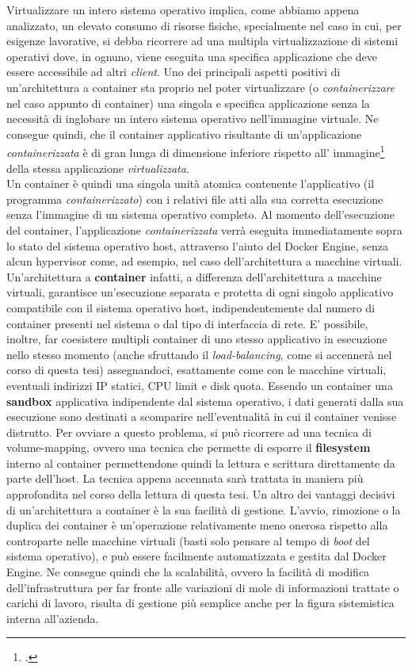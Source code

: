 Virtualizzare un intero sistema operativo implica, come abbiamo appena analizzato, un elevato consumo di risorse fisiche, specialmente nel caso in cui, per esigenze lavorative, si debba ricorrere ad una multipla virtualizzazione di sistemi operativi dove, in ognuno, viene eseguita una specifica applicazione che deve essere accessibile ad altri \textit{client}.
Uno dei principali aspetti positivi di un'architettura a container sta proprio nel poter virtualizzare (o \textit{containerizzare} nel caso appunto di container) una singola e specifica applicazione senza la necessità di inglobare un intero sistema operativo nell'immagine virtuale. Ne consegue quindi, che il container applicativo risultante di un'applicazione \textit{containerizzata} è di gran lunga di dimensione inferiore rispetto all' immagine\footcite{inteso come dimensione in Gb del virtual disk image (*.vdi) dell'immagine virtualizzata} della stessa applicazione \textit{virtualizzata}.\\
Un container è quindi una singola unità atomica contenente l'applicativo (il programma \textit{containerizzato}) con i relativi file atti alla sua corretta esecuzione senza l'immagine di un sistema operativo completo.
Al momento dell'esecuzione del container, l'applicazione \textit{containerizzata} verrà eseguita immediatamente sopra lo stato del sistema operativo host, attraverso l'aiuto del Docker Engine, senza alcun hypervisor come, ad esempio, nel caso dell'architettura a macchine virtuali.
Un'architettura a \textbf{container} infatti, a differenza dell'architettura a macchine virtuali, garantisce un'esecuzione separata e protetta di ogni singolo applicativo compatibile con il sistema operativo host, indipendentemente dal numero di container presenti nel sistema o dal tipo di interfaccia di rete. E' possibile, inoltre, far coesistere multipli container di uno stesso applicativo in esecuzione nello stesso momento (anche sfruttando il \textit{load-balancing}, come si accennerà nel corso di questa tesi) assegnandoci, esattamente come con le macchine virtuali, eventuali indirizzi IP statici, CPU limit e disk quota.
Essendo un container una \textbf{\gls{sandbox}} applicativa indipendente dal sistema operativo, i dati generati dalla sua esecuzione sono destinati a scomparire nell'eventualità in cui il container venisse distrutto. Per ovviare a questo problema, si può ricorrere ad una tecnica di volume-mapping, ovvero una tecnica che permette di esporre il \textbf{\gls{filesystem}} interno al container permettendone quindi la lettura e scrittura direttamente da parte dell'host. La tecnica appena accennata sarà trattata in maniera più approfondita nel corso della lettura di questa tesi.
Un altro dei vantaggi decisivi di un'architettura a container è la sua facilità di gestione. L'avvio, rimozione o la duplica dei container è un'operazione relativamente meno onerosa rispetto alla controparte nelle macchine virtuali (basti solo pensare al tempo di \textit{\gls{boot}} del sistema operativo), e può essere facilmente automatizzata e gestita dal Docker Engine. Ne consegue quindi che la scalabilità, ovvero la facilità di modifica dell'infrastruttura per far fronte alle variazioni di mole di informazioni trattate o carichi di lavoro, risulta di gestione più semplice anche per la figura sistemistica interna all'azienda.

